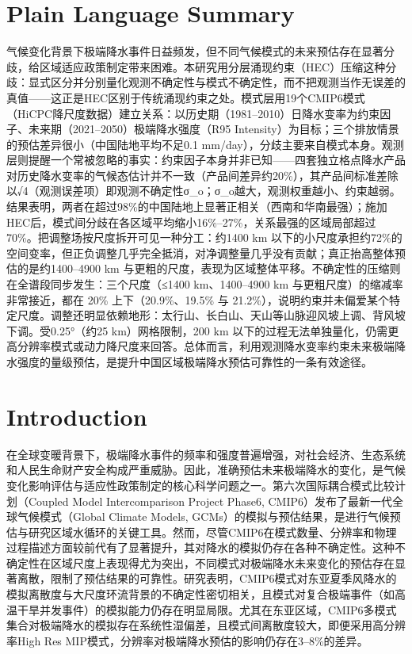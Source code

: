 \documentclass[draft]{agujournal2019}
\begin{document}
\section*{Plain Language Summary}
气候变化背景下极端降水事件日益频发，但不同气候模式的未来预估存在显著分歧，给区域适应政策制定带来困难。本研究用分层涌现约束（HEC）压缩这种分歧：显式区分并分别量化观测不确定性与模式不确定性，而不把观测当作无误差的真值------这正是HEC区别于传统涌现约束之处。模式层用19个CMIP6模式（HiCPC降尺度数据）建立关系：以历史期（1981--2010）日降水变率为约束因子、未来期（2021--2050）极端降水强度（R95 Intensity）为目标；三个排放情景的预估差异很小（中国陆地平均不足0.1 mm/day），分歧主要来自模式本身。观测层则提醒一个常被忽略的事实：约束因子本身并非已知------四套独立格点降水产品对历史降水变率的气候态估计并不一致（产品间差异约20\%），其产品间标准差除以√4（观测误差项）即观测不确定性σ\_o；σ\_o越大，观测权重越小、约束越弱。结果表明，两者在超过98\%的中国陆地上显著正相关（西南和华南最强）；施加HEC后，模式间分歧在各区域平均缩小16\%--27\%，关系最强的区域局部超过70\%。把调整场按尺度拆开可见一种分工：约1400 km 以下的小尺度承担约72\%的空间变率，但正负调整几乎完全抵消，对净调整量几乎没有贡献；真正抬高整体预估的是约1400--4900 km 与更粗的尺度，表现为区域整体平移。不确定性的压缩则在全谱段同步发生：三个尺度（≤1400 km、1400--4900 km 与更粗尺度）的缩减率非常接近，都在 20\% 上下（20.9\%、19.5\% 与 21.2\%），说明约束并未偏爱某个特定尺度。调整还明显依赖地形：太行山、长白山、天山等山脉迎风坡上调、背风坡下调。受0.25°（约25 km）网格限制，200 km 以下的过程无法单独量化，仍需更高分辨率模式或动力降尺度来回答。总体而言，利用观测降水变率约束未来极端降水强度的量级预估，是提升中国区域极端降水预估可靠性的一条有效途径。

\section{Introduction}
\label{sec:1}

在全球变暖背景下，极端降水事件的频率和强度普遍增强，对社会经济、生态系统和人民生命财产安全构成严重威胁。因此，准确预估未来极端降水的变化，是气候变化影响评估与适应性政策制定的核心科学问题之一。第六次国际耦合模式比较计划（Coupled Model Intercomparison Project Phase6, CMIP6）发布了最新一代全球气候模式（Global Climate Models, GCMs）的模拟与预估结果，是进行气候预估与研究区域水循环的关键工具\cite{eyring_overview_2016}。然而，尽管CMIP6在模式数量、分辨率和物理过程描述方面较前代有了显著提升，其对降水的模拟仍存在各种不确定性。这种不确定性在区域尺度上表现得尤为突出，不同模式对极端降水未来变化的预估存在显著离散，限制了预估结果的可靠性\cite{sillmann_understanding_2017}。研究表明，CMIP6模式对东亚夏季风降水的模拟离散度与大尺度环流背景的不确定性密切相关\cite{huang_inter-model_2022}，且模式对复合极端事件（如高温干旱并发事件）的模拟能力仍存在明显局限\cite{liu_evaluation_2025}。尤其在东亚区域，CMIP6多模式集合对极端降水的模拟存在系统性湿偏差，且模式间离散度较大\cite{kim_future_2025}，即便采用高分辨率High Res MIP模式，分辨率对极端降水预估的影响仍存在3--8\%的差异\cite{liang_projections_2023,zhang_resolution_2025,hu_upgraded_2025}。
\end{document}
